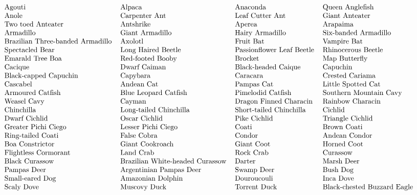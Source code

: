 
\tiny
\[\begin{tabular}{llll}
Agouti   & Alpaca   & Anaconda  & Queen Anglefish  \\
Anole   & Carpenter Ant  & Leaf Cutter Ant   & Giant Anteater  \\
Two toed Anteater  & Antshrike   & Aperea   & Arapaima \\
Armadillo   & Giant Armadillo   & Hairy Armadillo  & Six-banded Armadillo  \\
Brazilian Three-banded Armadillo   & Axolotl  & Fruit Bat   & Vampire Bat  \\
Spectacled Bear  & Long Haired Beetle   & Passionflower Leaf Beetle   & Rhinocerous Beetle \\
Emarald Tree Boa   & Red-footed Booby   & Brocket  & Map Butterfly  \\
Cacique   & Dwarf Caiman  & Black-headed Caique   & Capuchin  \\
Black-capped Capuchin  & Capybara   & Caracara   & Crested Cariama \\
Cascabel   & Andean Cat   & Pampas Cat  & Little Spotted Cat  \\
Armoured Catfish   & Blue Leopard Catfish  & Pimelodid Catfish   & Southern Mountain Cavy  \\
Weasel Cavy  & Cayman   & Dragon Finned Characin   & Rainbow Characin \\
Chinchilla   & Long-tailed Chinchilla   & Short-tailed Chinchilla  & Cichlid  \\
Dwarf Cichlid   & Oscar Cichlid  & Pike Cichlid   & Triangle Cichlid  \\
Greater Pichi Ciego  & Lesser Pichi Ciego   & Coati   & Brown Coati \\
Ring-tailed Coati   & False Cobra   & Condor  & Andean Condor  \\
Boa Constrictor   & Giant Cookroach  & Giant Coot   & Horned Coot  \\
Flightless Cormorant  & Land Crab   & Rock Crab   & Curassow \\
Black Curassow   & Brazilian White-headed Curassow   & Darter  & Marsh Deer  \\
Pampas Deer   & Argentinian Pampas Deer  & Swamp Deer   & Bush Dog  \\
Small-eared Dog  & Amazonian Dolphin   & Douroucouli   & Inca Dove \\
Scaly Dove   & Muscovy Duck   & Torrent Duck  & Black-chested Buzzard Eagle  \\

\end{tabular}\]
